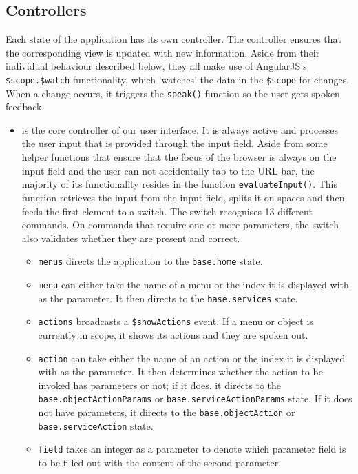 \subsection{Controllers}
\label{subsection:controllers}
Each state of the application has its own controller. The controller ensures that the corresponding view is updated with new information. Aside from their individual behaviour described below, they all make use of AngularJS's \texttt{\$scope.\$watch} functionality, which 'watches' the data in the \texttt{\$scope} for changes. When a change occurs, it triggers the \texttt{speak()} function so the user gets spoken feedback.

\begin{itemize}
	\item {} is the core controller of our user interface. It is always active and processes the user input that is provided through the input field. Aside from some helper functions that ensure that the focus of the browser is always on the input field and the user can not accidentally tab to the URL bar, the majority of its functionality resides in the function \texttt{evaluateInput()}. This function retrieves the input from the input field, splits it on spaces and then feeds the first element to a switch. The switch recognises 13 different commands. On commands that require one or more parameters, the switch also validates whether they are present and correct.
	\begin{itemize}
		\item \texttt{menus} directs the application to the \texttt{base.home} state.
		\item \texttt{menu} can either take the name of a menu or the index it is displayed with as the parameter. It then directs to the \texttt{base.services} state.
		\item \texttt{actions} broadcasts a \texttt{\$showActions} event. If a menu or object is currently in scope, it shows its actions and they are spoken out.
		\item \texttt{action} can take either the name of an action or the index it is displayed with as the parameter. It then determines whether the action to be invoked has parameters or not; if it does, it directs to the \texttt{base.objectActionParams} or \texttt{base.serviceActionParams} state. If it does not have parameters, it directs to the \texttt{base.objectAction} or \newline \texttt{base.serviceAction} state.
		\item \texttt{field} takes an integer as a parameter to denote which parameter field is to be filled out with the content of the second parameter.

\end{itemize}
\end{itemize}
